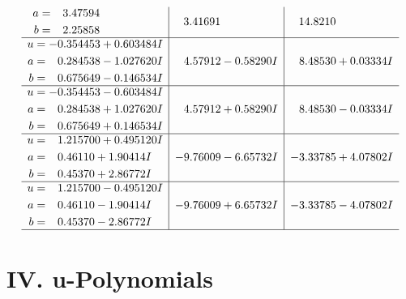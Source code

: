 \documentclass[1p]{elsarticle_modified}
\theoremstyle{definition}
\begin{document}
$$\begin{array}{c|c|c}
\begin{aligned}
a &= \phantom{-}3.47594\phantom{ +0.000000I} \\
b &= \phantom{-}2.25858\phantom{ +0.000000I}\end{aligned}
 & \phantom{-}3.41691\phantom{ +0.000000I} & \phantom{-}14.8210\phantom{ +0.000000I} \\ \hline\begin{aligned}
u &= -0.354453 + 0.603484 I \\
a &= \phantom{-}0.284538 - 1.027620 I \\
b &= \phantom{-}0.675649 - 0.146534 I\end{aligned}
 & \phantom{-}4.57912 - 0.58290 I & \phantom{-}8.48530 + 0.03334 I \\ \hline\begin{aligned}
u &= -0.354453 - 0.603484 I \\
a &= \phantom{-}0.284538 + 1.027620 I \\
b &= \phantom{-}0.675649 + 0.146534 I\end{aligned}
 & \phantom{-}4.57912 + 0.58290 I & \phantom{-}8.48530 - 0.03334 I \\ \hline\begin{aligned}
u &= \phantom{-}1.215700 + 0.495120 I \\
a &= \phantom{-}0.46110 + 1.90414 I \\
b &= \phantom{-}0.45370 + 2.86772 I\end{aligned}
 & -9.76009 - 6.65732 I & -3.33785 + 4.07802 I \\ \hline\begin{aligned}
u &= \phantom{-}1.215700 - 0.495120 I \\
a &= \phantom{-}0.46110 - 1.90414 I \\
b &= \phantom{-}0.45370 - 2.86772 I\end{aligned}
 & -9.76009 + 6.65732 I & -3.33785 - 4.07802 I\\
 \hline 
 \end{array}$$\newpage
\newpage\renewcommand{\arraystretch}{1}
\centering \section*{ IV. u-Polynomials}
\end{document}
